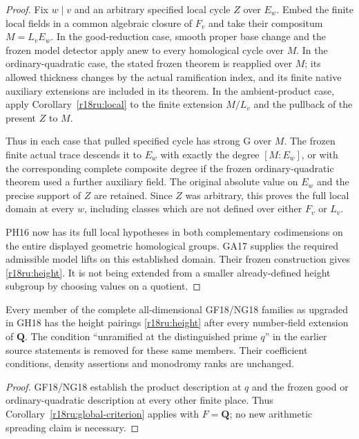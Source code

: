 \begin{proof}
Fix $w\mid v$ and an arbitrary specified local cycle $Z$ over
$E_w$.  Embed the finite local fields in a common algebraic closure
of $F_v$ and take their compositum $M=L_vE_w$.
In the good-reduction case, smooth proper base change and the frozen
model detector apply anew to every homological cycle over $M$.
In the ordinary-quadratic case, the stated frozen theorem is reapplied
over $M$; its allowed thickness changes by the actual ramification
index, and its finite native auxiliary extensions are included in
its theorem.  In the ambient-product case, apply
Corollary~\ref{r18ru:local} to the finite extension $M/L_v$ and
the pullback of the present $Z$ to $M$.

Thus in each case that pulled specified cycle has strong G over
$M$.  The frozen finite actual trace descends it to $E_w$ with
exactly the degree $[M:E_w]$, or with the corresponding complete
composite degree if the frozen ordinary-quadratic theorem used a
further auxiliary field.  The original absolute value on $E_w$
and the precise support of $Z$ are retained.  Since $Z$ was arbitrary,
this proves the full local domain at every $w$, including classes
which are not defined over either $F_v$ or $L_v$.

PH16 now has its full local hypotheses in both complementary
codimensions on the entire displayed geometric homological groups.
GA17 supplies the required admissible model lifts on this established
domain.  Their frozen construction gives
\eqref{r18ru:height}.  It is not being extended from a smaller
already-defined height subgroup by choosing values on a quotient.
\end{proof}

\begin{corollary}
\label{r18ru:existing-global-families}
Every member of the complete all-dimensional GF18/NG18 families
as upgraded in GH18 has the height pairings
\eqref{r18ru:height} after every number-field extension of
$\mathbf Q$.  The condition ``unramified at the distinguished prime
$q$'' in the earlier source statements is removed for these same
members.  Their coefficient conditions, density assertions and
monodromy ranks are unchanged.
\end{corollary}

\begin{proof}
GF18/NG18 establish the product description at $q$ and the frozen
good or ordinary-quadratic description at every other finite place.
Thus Corollary~\ref{r18ru:global-criterion} applies with $F=\mathbf Q$;
no new arithmetic spreading claim is necessary.
\end{proof}

